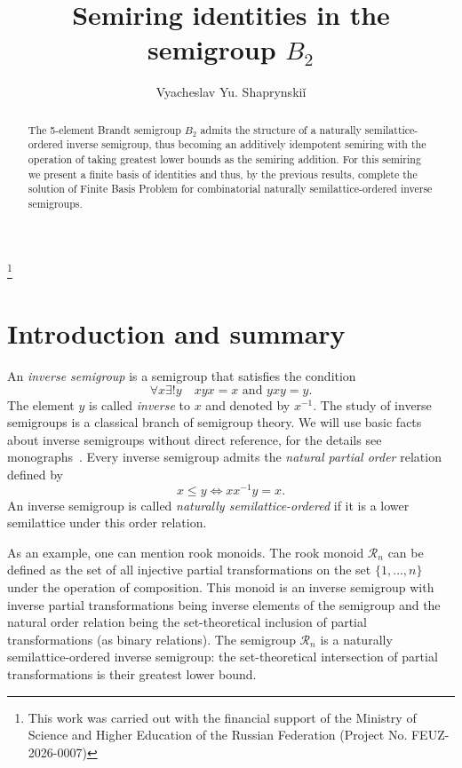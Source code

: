 \documentclass[12pt,draft]{amsart}
\begin{document}
\title[Semiring identities in $B_2$]{Semiring identities in the semigroup $B_2$}

\author{Vyacheslav Yu. Shaprynski\v i}

\address{Ural Federal University, Institute of Natural Sciences and Mathematics, 620000, Ekaterinburg, Russia}


\thanks{This work was carried out with the financial support of the Ministry of Science and Higher Education of the Russian Federation (Project No. FEUZ-2026-0007)}


\begin{abstract}
The 5-element Brandt semigroup $B_2$ admits the structure of a naturally semilattice-ordered inverse semigroup, thus becoming an additively idempotent semiring with the operation of taking greatest lower bounds as the semiring addition. For this semiring we present a finite basis of identities and thus, by the previous results, complete the solution of Finite Basis Problem for combinatorial naturally semilattice-ordered inverse semigroups.
\end{abstract}

\maketitle

\section{Introduction and summary}

An \emph{inverse semigroup} is a semigroup that satisfies the condition
$$\forall x\exists!y\quad xyx=x\text{ and }yxy=y.$$
The element $y$ is called \emph{inverse} to $x$ and denoted by $x^{-1}$. The study of inverse semigroups is a classical branch of semigroup theory. We will use basic facts about inverse semigroups without direct reference, for the details see monographs~\cite{Lawson-99,Petrich-84}. Every inverse semigroup admits the \emph{natural partial order} relation defined by
$$x\le y\iff xx^{-1}y=x.$$
An inverse semigroup is called \emph{naturally semilattice-ordered} if it is a lower semilattice under this order relation.

As an example, one can mention rook monoids. The rook monoid $\mathcal R_n$ can be defined as the set of all injective partial transformations on the set $\{1,\dots,n\}$ under the operation of composition. This monoid is an inverse semigroup with inverse partial transformations being inverse elements of the semigroup and the natural order relation being the set-theoretical inclusion of partial transformations (as binary relations). The semigroup $\mathcal R_n$ is a naturally semilattice-ordered inverse semigroup: the set-theoretical intersection of partial transformations is their greatest lower bound.
\end{document}
